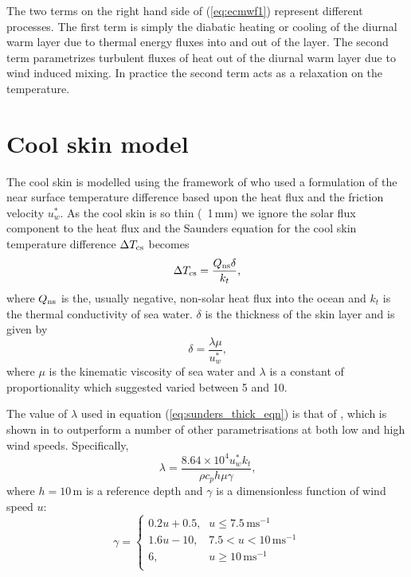 \documentclass[../main/NEMO_manual]{subfiles}
\begin{document}
The two terms on the right hand side of (\autoref{eq:ecmwf1}) represent different processes.
The first term is simply the diabatic heating or cooling of the diurnal warm layer due to
thermal energy fluxes into and out of the layer.
The second term parametrizes turbulent fluxes of heat out of the diurnal warm layer due to wind induced mixing.
In practice the second term acts as a relaxation on the temperature.


\section{Cool skin model}
\label{sec:cool_skin_sec}


The cool skin is modelled using the framework of \citet{Saunders_JAS82} who used a formulation of the near surface temperature difference based upon the heat flux and the friction velocity $u^*_{w}$.
As the cool skin is so thin (~1\,mm) we ignore the solar flux component to the heat flux and the Saunders equation for the cool skin temperature difference $\Delta T_{\rm{cs}}$ becomes
\[
  \Delta T_{\rm{cs}}=\frac{Q_{\rm{ns}}\delta}{k_t} \mbox{,}
\]
where $Q_{\rm{ns}}$ is the, usually negative, non-solar heat flux into the ocean and
$k_t$ is the thermal conductivity of sea water.
$\delta$ is the thickness of the skin layer and is given by
\begin{equation}
\label{eq:sunders_thick_eqn}
\delta=\frac{\lambda \mu}{u^*_{w}} \mbox{,}
\end{equation}
where $\mu$ is the kinematic viscosity of sea water and $\lambda$ is a constant of proportionality which
\citet{Saunders_JAS82} suggested varied between 5 and 10.

The value of $\lambda$ used in equation (\autoref{eq:sunders_thick_eqn}) is that of \citet{Artale_al_JGR02},
which is shown in \citet{Tu_Tsuang_GRL05} to outperform a number of other parametrisations at
both low and high wind speeds.
Specifically,
\[
  \lambda = \frac{ 8.64\times10^4 u^*_{w} k_t }{ \rho c_p h \mu \gamma }\mbox{,}
\]
where $h=10$\,m is a reference depth and
$\gamma$ is a dimensionless function of wind speed $u$:
\[
  \gamma =
  \begin{cases}
    0.2u+0.5\mbox{,} & u \le 7.5\,\mbox{ms}^{-1} \\
    1.6u-10\mbox{,} & 7.5 < u < 10\,\mbox{ms}^{-1} \\
    6\mbox{,} & u \ge 10\,\mbox{ms}^{-1} \\
  \end{cases}
\]

\biblio
\end{document}
